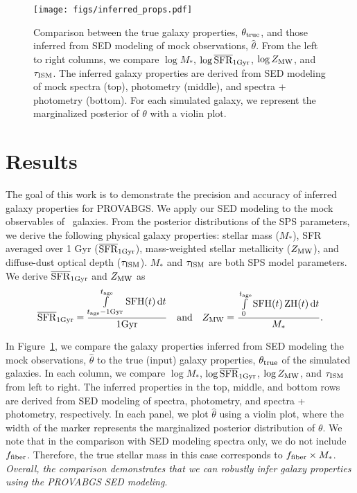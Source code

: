 \begin{figure}
\begin{center}
\texttt{[image: figs/inferred\_props.pdf]}
\caption{
    Comparison between the true galaxy properties, $\theta_{\rm true}$, and
    those inferred from SED modeling of mock observations, $\hat{\theta}$. 
    From the left to right columns, we compare $\log M_*$, $\log \overline{\rm SFR}_{\rm 1Gyr}$, 
    $\log Z_{\rm MW}$, and $\tau_{\rm ISM}$. 
    The inferred galaxy properties are derived from SED modeling of mock
    spectra (top), photometry (middle), and spectra + photometry (bottom). 
    For each simulated galaxy, we represent the marginalized posterior of
    $\theta$ with a violin plot.  
}
\label{fig:prop_inf}
\end{center}
\end{figure}

\section{Results} \label{sec:results}
The goal of this work is to demonstrate the precision and accuracy of inferred
galaxy properties for PROVABGS. 
We apply our SED modeling to the mock observables of  \lgal~galaxies.
From the posterior distributions of the SPS parameters, we derive the following
physical galaxy properties: stellar mass ($M_*$), SFR averaged over 1 Gyr
($\overline{\rm SFR}_{\rm 1Gyr}$), mass-weighted stellar metallicity ($Z_{\rm MW}$), and diffuse-dust
optical depth ($\tau_{\rm ISM}$).
$M_*$ and $\tau_{\rm ISM}$ are both SPS model parameters. 
We derive $\overline{\rm SFR}_{\rm 1Gyr}$ and $Z_{\rm MW}$ as 
\begin{equation}
    \avgsfr = \frac{\int\limits_{t_{\rm age} - {\rm 1 Gyr}}^{t_{\rm age}}{\rm
    SFH}(t)\,{\rm d}t}{{\rm 1 Gyr}} \quad{\rm and}\quad
    Z_{\rm MW} = \frac{\int\limits_0^{t_{\rm age}}{\rm SFH}(t)\,{\rm
    ZH}(t)\,{\rm d}t}{M_*}.
\end{equation} 

In Figure~\ref{fig:prop_inf}, we compare the galaxy properties inferred from
SED modeling the mock observations, $\hat{\theta}$ to the true (input) galaxy
properties, $\theta_{\rm true}$ of the simulated galaxies.
In each column, we compare $\log M_*$, $\log \overline{\rm SFR}_{\rm 1Gyr}$, $\log Z_{\rm MW}$, and
$\tau_{\rm ISM}$ from left to right. 
The inferred properties in the top, middle, and bottom rows are derived from
SED modeling of spectra, photometry, and spectra + photometry, respectively.
In each panel, we plot $\hat{\theta}$ using a violin plot, where the width
of the marker represents the marginalized posterior distribution of $\theta$. 
We note that in the comparison with SED modeling spectra only, we do not
include $f_{\rm fiber}$. 
Therefore, the true stellar mass in this case corresponds to $f_{\rm fiber}
\times M_*$. 
\emph{Overall, the comparison demonstrates that we can robustly infer galaxy
properties using the {\sc PROVABGS} SED modeling}. 

